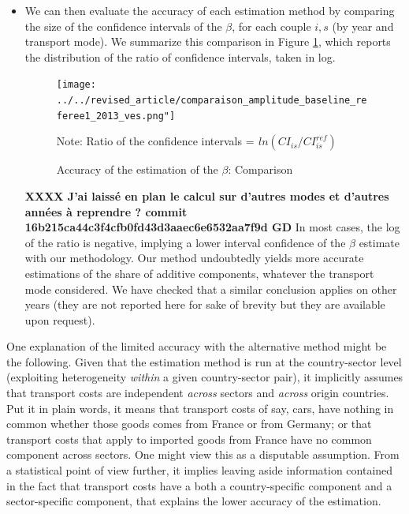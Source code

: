 \documentclass[a4paper,11pt]{article}
\begin{document}
\begin{itemize}
\begin{itemize}
    \item We can then evaluate the accuracy of each estimation method by comparing the size of the confidence intervals of the $\beta$, for each couple $i,s$ (by year and transport mode). We summarize this comparison in Figure \ref{fig:accuracy_beta}, which reports the distribution of the ratio of confidence intervals, taken in log.


    \begin{figure}[htbp]
    \caption{Accuracy of the estimation of the $\beta$: Comparison}
    \label{fig:accuracy_beta}
    \begin{center}
    \texttt{[image: ../../revised\_article/comparaison\_amplitude\_baseline\_referee1\_2013\_ves.png"]}
    \begin{minipage} [c]  {5in} \scriptsize%
    	    Note: Ratio of the confidence intervals = $ _{}ln(CI_{is}/CI^{ref}_{is})$
    \end{minipage}

    \end{center}
    \end{figure}

   \textbf{XXXX J’ai laissé en plan le calcul sur d’autres modes et d’autres années à reprendre ? commit 16b215ca44c3f4cfb0fd43d3aaec6e6532aa7f9d  GD} In most cases, the log of the ratio is negative, implying a lower interval confidence of the $\beta$ estimate with our methodology. Our method undoubtedly yields more accurate estimations of the share of additive components, whatever the transport mode considered. We have checked that a similar conclusion applies on other years (they are not reported here for sake of brevity but they are available upon request).
    \end{itemize}

One explanation of the limited accuracy with the alternative method might be the following. Given that the estimation method is run at the country-sector level (exploiting heterogeneity \textit{within} a given country-sector pair), it implicitly assumes that transport costs are independent \textit{across} sectors and \textit{across} origin countries. Put it in plain words, it means that transport costs of say, cars, have nothing in common whether those goods comes from France or from Germany; or that transport costs that apply to imported goods from France have no common component across sectors. One might view this as a disputable assumption. From a statistical point of view further, it implies leaving aside information contained in the fact that transport costs have a both a country-specific component and a sector-specific component, that explains the lower accuracy of the estimation.


\end{itemize}
\end{document}
